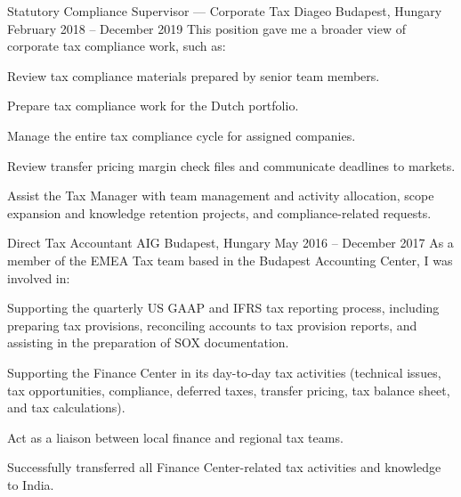 \begin{cventries}

  \cventry
    {Statutory Compliance Supervisor — Corporate Tax} %
    {Diageo} %
    {Budapest, Hungary} %
    {February 2018 -- December 2019} %
    {This position gave me a broader view of corporate tax compliance work, such as:} %
    {
      \begin{cvitems} %
        \item {Review tax compliance materials prepared by senior team members.}
        \item {Prepare tax compliance work for the Dutch portfolio.}
        \item {Manage the entire tax compliance cycle for assigned companies.}
        \item {Review transfer pricing margin check files and communicate deadlines to markets.}
        \item {Assist the Tax Manager with team management and activity allocation, scope expansion and knowledge retention projects, and compliance-related requests.}
      \end{cvitems}
    }


  \cventry
    {Direct Tax Accountant} %
    {AIG} %
    {Budapest, Hungary} %
    {May 2016 -- December 2017} %
    {As a member of the EMEA Tax team based in the Budapest Accounting Center, I was involved in:} %
    {
      \begin{cvitems} %
        \item {Supporting the quarterly US GAAP and IFRS tax reporting process, including preparing tax provisions, reconciling accounts to tax provision reports, and assisting in the preparation of SOX documentation.}
        \item {Supporting the Finance Center in its day-to-day tax activities (technical issues, tax opportunities, compliance, deferred taxes, transfer pricing, tax balance sheet, and tax calculations).}
        \item {Act as a liaison between local finance and regional tax teams.}
        \item {Successfully transferred all Finance Center-related tax activities and knowledge to India.}
      \end{cvitems}
    }


\end{cventries}
